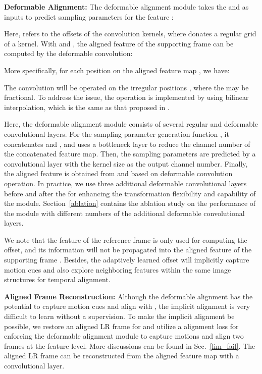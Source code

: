 \documentclass[10pt,twocolumn,letterpaper]{article}
\begin{document}
\noindent \textbf{Deformable Alignment:} The deformable alignment module takes the  and  as inputs to predict sampling parameters  for the feature :

Here,  refers to the offsets of the convolution kernels, where  donates a regular grid of a  kernel. With  and , the aligned feature  of the supporting frame can be computed by the deformable convolution:

More specifically, for each position  on the aligned feature map , we have:

The convolution will be operated on the irregular positions , where the  may be fractional. To address the issue, the operation is implemented by using bilinear interpolation, which is the same as that proposed in \cite{Dai_2017_ICCV}.


Here, the deformable alignment module consists of several regular and deformable convolutional layers. For the sampling parameter generation function , it concatenates  and , and uses a  bottleneck layer to reduce the channel number of the concatenated feature map. Then, the sampling parameters are predicted by a convolutional layer with the kernel size  as the output channel number. Finally, the aligned feature  is obtained from  and  based on deformable convolution operation. In practice, we use three additional deformable convolutional layers before and after the  for enhancing the transformation flexibility and capability of the module. Section~\ref{ablation} contains the ablation study on the performance of the module with different numbers of the additional deformable convolutional layers.

We note that the feature of the reference frame  is only used for computing the offset, and its information will not be propagated into the aligned feature of the supporting frame . Besides, the adaptively learned offset will implicitly capture motion cues and also explore neighboring features within the same image structures for temporal alignment.

\noindent \textbf{Aligned Frame Reconstruction:}  Although the deformable alignment has the potential to capture motion cues and align  with , the implicit alignment is very difficult to learn without a supervision. To make the implicit alignment be possible, we restore an aligned LR frame  for  and utilize a alignment loss for enforcing the deformable alignment module to capture motions and align two frames at the feature level. More discussions can be found in Sec.~\ref{lim_fail}. The aligned LR frame  can be reconstructed from the aligned feature map with a  convolutional layer.
\end{document}
